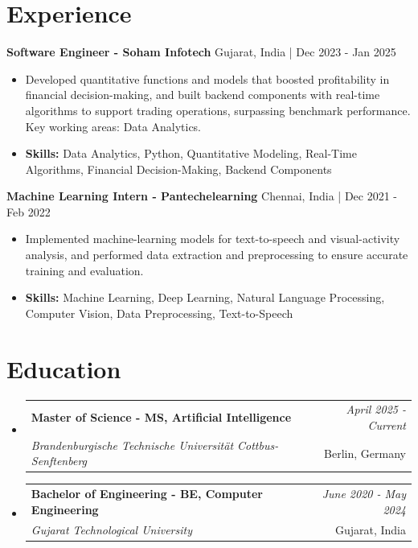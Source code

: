 \documentclass[a4paper,11pt]{article}
\makeatletter
\newcommand{\resumeSubheading}[4]{
\vspace{0.5mm}\item
    \begin{tabular*}{\linewidth}[t]{l@{\extracolsep{\fill}}r}
        \textbf{#1} & \textit{\footnotesize{#4}} \\
        \textit{\footnotesize{#3}} &  \footnotesize{#2}\\
    \end{tabular*}
    \vspace{-2.4mm}
}
\makeatother
\begin{document}
\section{\textbf{Experience}}


\vspace{1mm}
  \textbf{Software Engineer - Soham Infotech} \hfill Gujarat, India | Dec 2023 - Jan 2025
\vspace{-1.5mm} %
\begin{itemize}
  \item Developed quantitative functions and models that boosted profitability in financial decision-making, and built backend components with real-time algorithms to support trading operations, surpassing benchmark performance. Key working areas: Data Analytics.

\vspace{-2mm}
  \item \textbf{Skills:} Data Analytics, Python, Quantitative Modeling, Real-Time Algorithms, Financial Decision-Making, Backend Components
\end{itemize}

\vspace{1mm}
  \textbf{Machine Learning Intern - Pantechelearning} \hfill Chennai, India | Dec 2021 - Feb 2022
\vspace{-1.5mm} %
\begin{itemize}
  \item Implemented machine-learning models for text-to-speech and visual-activity analysis, and performed data extraction and preprocessing to ensure accurate training and evaluation.
\vspace{-2mm}
  \item \textbf{Skills:} Machine Learning, Deep Learning, Natural Language Processing, Computer Vision, Data Preprocessing, Text-to-Speech
\end{itemize}\section{\textbf{Education}}
\vspace{-0.4mm}

\begin{itemize}[leftmargin=0.15in, label={}]
\resumeSubheading
{Master of Science - MS, Artificial Intelligence }{Berlin, Germany}
{Brandenburgische Technische Universität Cottbus-Senftenberg  }{April 2025 - Current}

\vspace{1.0mm} %
\resumeSubheading
{Bachelor of Engineering - BE, Computer Engineering  }{Gujarat, India}
{Gujarat Technological University }{June 2020 - May 2024}

\end{itemize}
\end{document}
